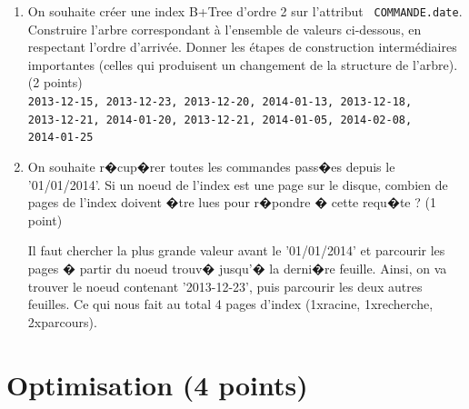 \begin{enumerate}
  \item On souhaite créer une index B+Tree d'ordre 2 sur l'attribut {\tt
  COMMANDE.date}. Construire l'arbre correspondant à l'ensemble de valeurs
  ci-dessous, en respectant l'ordre d'arrivée. Donner les étapes de construction
  intermédiaires importantes (celles qui produisent un changement de la
  structure de l'arbre). (2 points)\\
\texttt{2013-12-15, 2013-12-23, 2013-12-20, 2014-01-13, 2013-12-18,\\ 2013-12-21, 2014-01-20, 2013-12-21, 2014-01-05, 2014-02-08,\\ 2014-01-25}
\begin{correction}
\begin{figure}[h!]
\begin{center}
\end{center}
\end{figure}
\end{correction}

  \item On souhaite r�cup�rer toutes les commandes pass�es depuis le '01/01/2014'. Si un noeud de l'index est une page sur le disque, combien de pages de l'index doivent �tre lues pour r�pondre � cette requ�te ? (1 point)
\begin{correction}
Il faut chercher la plus grande valeur avant le '01/01/2014' et parcourir les pages � partir du noeud trouv� jusqu'� la derni�re feuille.
Ainsi, on va trouver le noeud contenant '2013-12-23', puis parcourir les deux autres feuilles. Ce qui nous fait au total 4 pages d'index (1xracine, 1xrecherche, 2xparcours).
\end{correction}
\end{enumerate}


\section{Optimisation (4 points)}

